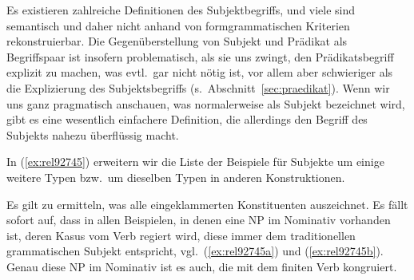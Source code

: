 \begin{exe}
  \ex\label{ex:rel23432}
  \begin{xlist}
  \end{xlist}
\end{exe}

Es existieren zahlreiche Definitionen des Subjektbegriffs, und viele sind semantisch und daher nicht anhand von formgrammatischen Kriterien rekonstruierbar.
Die Gegenüberstellung von Subjekt und Prädikat als Begriffspaar ist insofern problematisch, als sie uns zwingt, den Prädikatsbegriff explizit zu machen, was evtl.\ gar nicht nötig ist, vor allem aber schwieriger als die Explizierung des Subjektsbegriffs (s.\ Abschnitt~\ref{sec:praedikat}).
Wenn wir uns ganz pragmatisch anschauen, was normalerweise als Subjekt bezeichnet wird, gibt es eine wesentlich einfachere Definition, die allerdings den Begriff des Subjekts nahezu überflüssig macht.

In (\ref{ex:rel92745}) erweitern wir die Liste der Beispiele für Subjekte um einige weitere Typen bzw.\ um dieselben Typen in anderen Konstruktionen.

\begin{exe}
  \ex\label{ex:rel92745}
  \begin{xlist}
  \end{xlist}
\end{exe}

Es gilt zu ermitteln, was alle eingeklammerten Konstituenten auszeichnet.
Es fällt sofort auf, dass in allen Beispielen, in denen eine NP im Nominativ vorhanden ist, deren Kasus vom Verb regiert wird, diese immer dem traditionellen grammatischen Subjekt entspricht, vgl.\ (\ref{ex:rel92745a}) und (\ref{ex:rel92745b}).
Genau diese NP im Nominativ ist es auch, die mit dem finiten Verb kongruiert.

